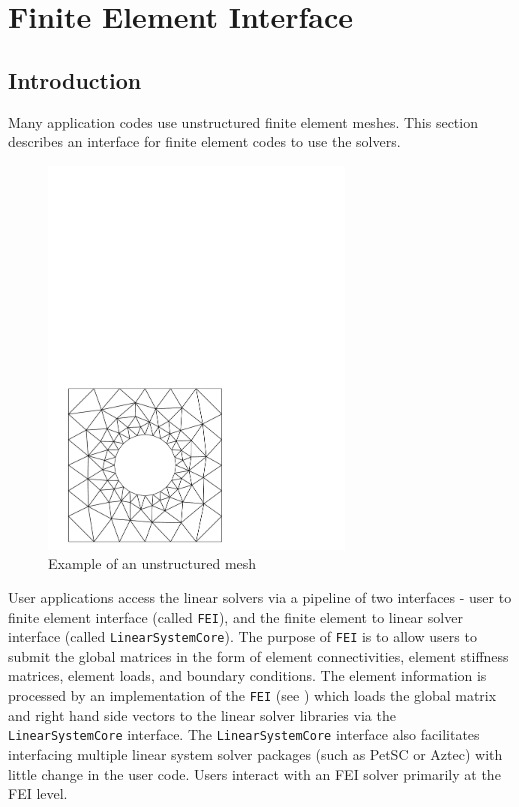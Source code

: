 \chapter{Finite Element Interface}
\label{ch-FEI}

\section{Introduction}

Many application codes use unstructured finite element meshes.
This section describes an interface for finite element codes 
to use the \hypre{} solvers.
\vspace{-2.0in}
\begin{figure}[htbp]
\centerline{\includegraphics[height=4.0in]{square-hole.pdf}}
\caption{Example of an unstructured mesh}
\end{figure}

User applications access the \hypre{} linear solvers via a pipeline of
two interfaces - user to finite element interface (called {\tt FEI}),
and the finite element to linear solver interface (called 
{\tt LinearSystemCore}). The purpose of {\tt FEI} is to allow users 
to submit the global matrices in the form of element connectivities, 
element stiffness matrices, element loads, and boundary conditions. 
The element information is processed by an implementation of the 
{\tt FEI} (see \cite{FEI-ref}) which loads the global matrix and right
hand side vectors to the linear solver libraries via the 
{\tt LinearSystemCore} interface.
The {\tt LinearSystemCore} interface also facilitates interfacing 
multiple linear system solver packages (such as PetSC or Aztec)
with little change in the user code. Users interact with an FEI
solver primarily at the FEI level.

